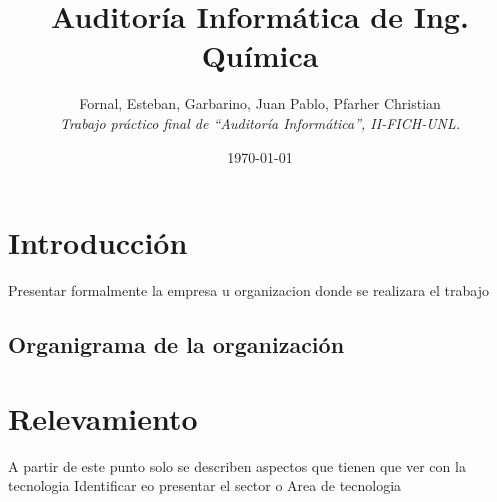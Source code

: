\documentclass[10pt,a4paper,final]{article}
\begin{document}
\title{Auditoría Informática de Ing. Química}
\author{Fornal, Esteban, Garbarino, Juan Pablo, Pfarher Christian\\
\textit{Trabajo práctico final de ``Auditoría Informática'', II-FICH-UNL.}}
\date{\today}
\maketitle
\newpage
\tableofcontents
\newpage
\section{Introducción}
Presentar formalmente la empresa u organizacion donde se realizara el trabajo
\subsection{Organigrama de la organización}
\section{Relevamiento}
A partir de este punto solo se describen aspectos que tienen que ver con la tecnologia
Identificar eo presentar el sector o Area de tecnologia
\end{document}
